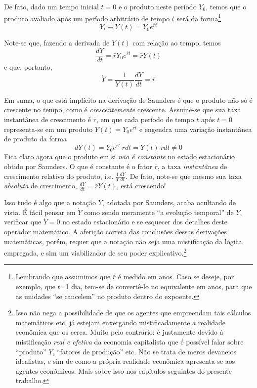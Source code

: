 De fato, dado um tempo inicial $t=0$ e o produto neste período $Y_0$, temos que o produto avaliado após um período arbitrário de tempo $t$ será da forma\footnote{Lembrando que assumimos que $\bar{r}$ é medido em anos. Caso se deseje, por exemplo, que $t$=1 dia, tem-se de convertê-lo no equivalente em anos, para que as unidades ``se cancelem'' no produto dentro do expoente.}
$$
Y_t \equiv Y(t) = Y_0 e^{\bar{r} t}  
$$

Note-se que, fazendo a derivada de $Y(t)$ com relação ao tempo, temos
$$
\frac{dY}{dt} = \bar{r} Y_0 e^{\bar{r}t} = \bar{r} Y(t)
$$
e que, portanto,
$$
\dot{Y} = \frac{1}{Y(t)} \frac{dY}{dt} = \bar{r}
$$

Em suma, o que está implícito na derivação de Saunders \parencite{Saunders1992} é que o produto não só é crescente no tempo, como é \textit{crescentemente} crescente. Assume-se que sua taxa instantânea de crescimento é $\bar{r}$, em que cada período de tempo $t$ após $t=0$ representa-se em um produto $Y(t) = Y_0 e^{\bar{r} t}$ e engendra uma variação instantânea de produto da forma
$$
dY(t) = Y_0 e^{\bar{r} t}\ \bar{r} dt = Y(t)\ \bar{r} dt \neq 0
$$
Fica claro agora que o produto em si \textit{não é constante} no estado estacionário obtido por Saunders. O que é constante é o fator $\bar{r}$, a taxa \textit{instantânea} de crescimento relativo do produto, i.e. $\frac{1}{Y} \frac{dY}{dt}$. De fato, note-se que mesmo sua taxa \textit{absoluta} de crescimento, $\frac{dY}{dt}=\bar{r}Y(t)$, está crescendo! 

Isso tudo é algo que a notação $\dot{Y}$, adotada por Saunders, acaba ocultando de vista. É fácil pensar em $\dot{Y}$ como sendo meramente ``a evolução temporal'' de $Y$, verificar que $\dot{Y} = 0$ no estado estacionário e se esquecer dos detalhes deste operador matemático. A aferição correta das conclusões dessas derivações matemáticas, porém, requer que a notação não seja uma mistificação da lógica empregada, e sim um viabilizador de seu poder explicativo.\footnote{Isso não nega a possibilidade de que os agentes que empreendam tais cálculos matemáticos etc. já estejam enxergando mistificadamente a realidade econômica que os cerca. Muito pelo contrário: é justamente devido à mistificação \textit{real e efetiva} da economia capitalista que é possível falar sobre ``produto'' $Y$, ``fatores de produção'' etc. Não se trata de meros devaneios idealistas, e sim de como a própria realidade econômica apresenta-se aos agentes econômicos. Mais sobre isso nos capítulos seguintes do presente trabalho.}



